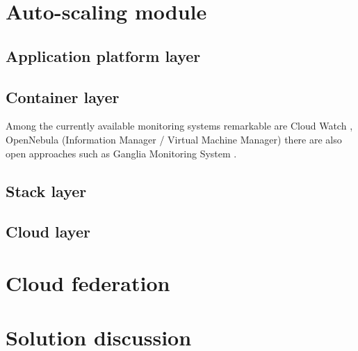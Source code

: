\section{Auto-scaling module}

\subsection{Application platform layer}

\subsection{Container layer}
Among the currently available monitoring systems remarkable are Cloud Watch \cite{CloudWatch}, OpenNebula (Information Manager / Virtual Machine Manager) \cite{OpenNebula} there are also open approaches such as Ganglia Monitoring System \cite{MaChCu04}.

\subsection{Stack layer}

\subsection{Cloud layer}


\section{Cloud federation}

\section{Solution discussion}
